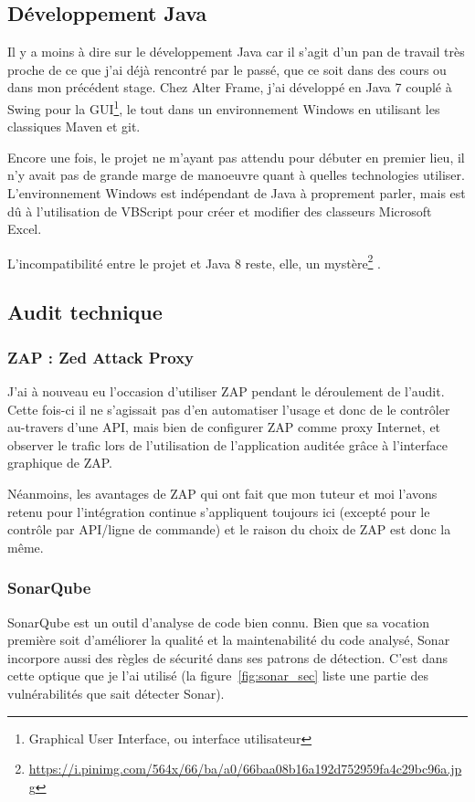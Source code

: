 \subsection{Développement Java}
Il y a moins à dire sur le développement Java car il s'agit d'un pan de travail très proche de ce que j'ai déjà rencontré par le passé, que ce soit dans des cours ou dans mon précédent stage. Chez Alter Frame, j'ai développé en Java 7 couplé à Swing pour la GUI\footnote{Graphical User Interface, ou interface utilisateur}, le tout dans un environnement Windows en utilisant les classiques Maven et git.

Encore une fois, le projet ne m'ayant pas attendu pour débuter en premier lieu, il n'y avait pas de grande marge de manoeuvre quant à quelles technologies utiliser. L'environnement Windows est indépendant de Java à proprement parler, mais est dû à l'utilisation de VBScript pour créer et modifier des classeurs Microsoft Excel.

L'incompatibilité entre le projet et Java 8 reste, elle, un mystère\footnote{\url{https://i.pinimg.com/564x/66/ba/a0/66baa08b16a192d752959fa4c29bc96a.jpg}} .

\subsection{Audit technique}
\subsubsection{ZAP : Zed Attack Proxy}
J'ai à nouveau eu l'occasion d'utiliser ZAP pendant le déroulement de l'audit. Cette fois-ci il ne s'agissait pas d'en automatiser l'usage et donc de le contrôler au-travers d'une API, mais bien de configurer ZAP comme proxy Internet, et observer le trafic lors de l'utilisation de l'application auditée grâce à l'interface graphique de ZAP.

Néanmoins, les avantages de ZAP qui ont fait que mon tuteur et moi l'avons retenu pour l'intégration continue s'appliquent toujours ici (excepté pour le contrôle par API/ligne de commande) et le raison du choix de ZAP est donc la même.

\subsubsection{SonarQube}
SonarQube est un outil d'analyse de code bien connu. Bien que sa vocation première soit d'améliorer la qualité et la maintenabilité du code analysé, Sonar incorpore aussi des règles de sécurité dans ses patrons de détection. C'est dans cette optique que je l'ai utilisé (la figure~\ref{fig:sonar_sec} liste une partie des vulnérabilités que sait détecter Sonar).

